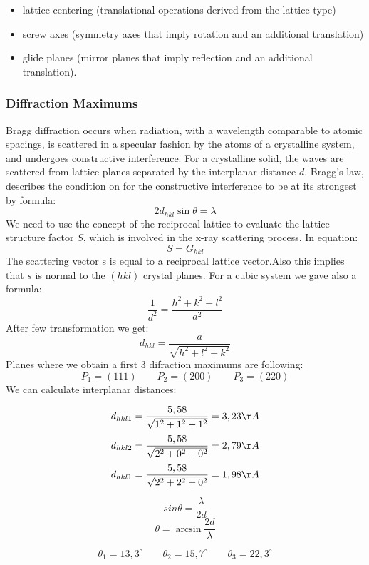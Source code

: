 \begin{itemize}
\item lattice centering (translational operations derived from the lattice type)
\item screw axes (symmetry axes that imply rotation and an additional translation)
\item glide planes (mirror planes that imply reflection and an additional translation).
\end{itemize}


\subsubsection*{Diffraction Maximums}
Bragg diffraction occurs when radiation, with a wavelength comparable to atomic 
spacings, is scattered in a specular fashion by the atoms of a crystalline system, and 
undergoes constructive interference. For a crystalline solid, the waves are scattered 
from lattice planes separated by the interplanar distance $d$. Bragg's law,  describes 
the condition on for the constructive interference to be at its strongest by formula:
\begin{equation}
\label{Bragg}
2d_{hkl} \sin{\theta} =  \lambda
\end{equation}
We need to use the concept of the reciprocal lattice to evaluate the lattice structure
factor $S$, which is involved in the x-ray scattering process. In equation:
\begin{equation}
S = G_{hkl}
\end{equation}
The scattering vector s is equal to a
reciprocal lattice vector.Also this implies that $s$ is normal to the $(hkl)$ crystal planes. For a cubic system we gave also a formula:
\begin{equation}
\frac{1}{d^2} = \frac{h^2 + k^2 + l^2}{a^2}
\end{equation}
After few transformation we get:
$$
d_{hkl} = \frac{a}{\sqrt{h^2 + l^2 + k^2}}
$$
Planes where we obtain a first 3 difraction maximums are following: 
$$P_1 = (111) \qquad P_2 = (200) \qquad P_3 = ( 220) $$  
We can calculate interplanar distances:

$$d_{hkl1} = \frac{5,58}{\sqrt{1^2 + 1^2 + 1^2}} = 3,23 \AA$$
$$d_{hkl2} = \frac{5,58}{\sqrt{2^2 + 0^2 + 0^2}} = 2,79 \AA$$
$$d_{hkl1} = \frac{5,58}{\sqrt{2^2 + 2^2 + 0^2}} = 1,98 \AA$$

$$
sin \theta = \frac{\lambda}{2d}
$$
$$
\theta = \arcsin{\frac{2d}{\lambda}}
$$

$$
\theta_1 = 13,3^\circ \qquad \theta_2 = 15,7^\circ \qquad \theta_3 = 22,3^\circ
$$


